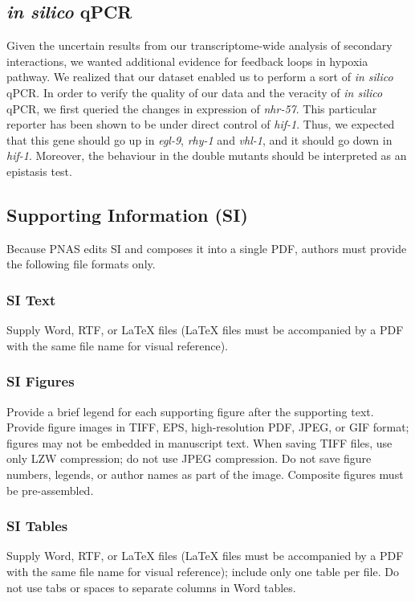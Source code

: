 \documentclass[9pt,twocolumn,twoside]{pnas-new}
\newcommand{\egl}{\emph{egl-9}}
\newcommand{\rhy}{\emph{rhy-1}}
\newcommand{\vhl}{\emph{vhl-1}}
\newcommand{\hif}{\emph{hif-1}}
\newcommand{\nhr}{\emph{nhr-57}}
\begin{document}
\subsection{\emph{in silico} qPCR}
\label{sub:qPCR}
Given the uncertain results from our transcriptome-wide analysis of secondary interactions, we wanted additional evidence for feedback loops in hypoxia pathway. We realized that our dataset enabled us to perform a sort of \emph{in silico} qPCR. In order to verify the quality of our data and the veracity of \emph{in silico} qPCR, we first queried the changes in expression of \nhr{}. This particular reporter has been shown to be under direct control of \hif{}. Thus, we expected that this gene should go up in \egl{}, \rhy{} and \vhl{}, and it should go down in \hif{}. Moreover, the behaviour in the double mutants should be interpreted as an epistasis test.



\subsection*{Supporting Information (SI)}
Because PNAS edits SI and composes it into a single PDF, authors must provide the following file formats only.

\subsubsection*{SI Text}

Supply Word, RTF, or LaTeX files (LaTeX files must be accompanied by a PDF with the same file name for visual reference).

\subsubsection*{SI Figures}

Provide a brief legend for each supporting figure after the supporting text. Provide figure images in TIFF, EPS, high-resolution PDF, JPEG, or GIF format; figures may not be embedded in manuscript text. When saving TIFF files, use only LZW compression; do not use JPEG compression. Do not save figure numbers, legends, or author names as part of the image. Composite figures must be pre-assembled.

\subsubsection*{SI Tables}

Supply Word, RTF, or LaTeX files (LaTeX files must be accompanied by a PDF with the same file name for visual reference); include only one table per file. Do not use tabs or spaces to separate columns in Word tables.
\end{document}
